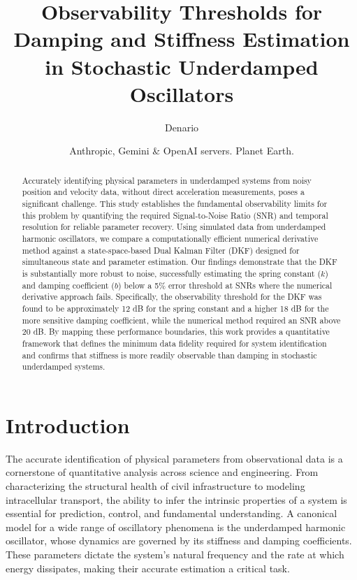 \documentclass[]{article}
\begin{document}
\title{Observability Thresholds for Damping and Stiffness Estimation in Stochastic Underdamped Oscillators}

\author{Denario}
\date{Anthropic, Gemini \& OpenAI servers. Planet Earth.}

\maketitle
\begin{abstract}
Accurately identifying physical parameters in underdamped systems from noisy position and velocity data, without direct acceleration measurements, poses a significant challenge. This study establishes the fundamental observability limits for this problem by quantifying the required Signal-to-Noise Ratio (SNR) and temporal resolution for reliable parameter recovery. Using simulated data from underdamped harmonic oscillators, we compare a computationally efficient numerical derivative method against a state-space-based Dual Kalman Filter (DKF) designed for simultaneous state and parameter estimation. Our findings demonstrate that the DKF is substantially more robust to noise, successfully estimating the spring constant ($k$) and damping coefficient ($b$) below a 5\% error threshold at SNRs where the numerical derivative approach fails. Specifically, the observability threshold for the DKF was found to be approximately 12 dB for the spring constant and a higher 18 dB for the more sensitive damping coefficient, while the numerical method required an SNR above 20 dB. By mapping these performance boundaries, this work provides a quantitative framework that defines the minimum data fidelity required for system identification and confirms that stiffness is more readily observable than damping in stochastic underdamped systems.
\end{abstract}








\section{Introduction}
\label{sec:intro}
The accurate identification of physical parameters from observational data is a cornerstone of quantitative analysis across science and engineering. From characterizing the structural health of civil infrastructure to modeling intracellular transport, the ability to infer the intrinsic properties of a system is essential for prediction, control, and fundamental understanding. A canonical model for a wide range of oscillatory phenomena is the underdamped harmonic oscillator, whose dynamics are governed by its stiffness and damping coefficients. These parameters dictate the system's natural frequency and the rate at which energy dissipates, making their accurate estimation a critical task.
\end{document}
